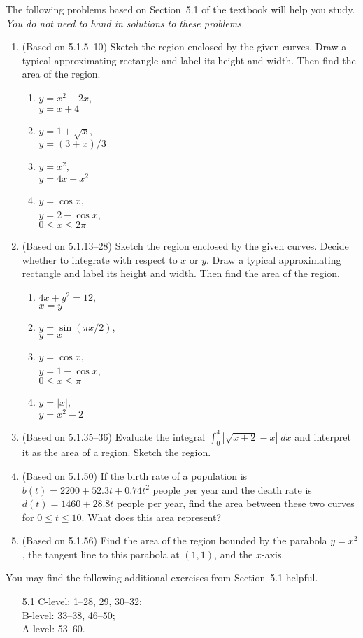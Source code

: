 \documentclass{article}
\title{\commonPSTitleZeroFiveOne}
\author{\commonAuthor}
\date{\commonDateZeroFiveOne}
\newcommand{\ds}{\displaystyle}
\begin{document}
\maketitle
\thispagestyle{empty}

\noindent
The following problems based on Section~5.1 of the textbook will help
you study.  \emph{You do not need to hand in solutions to these
  problems.}
\begin{enumerate}
\item (Based on 5.1.5--10) %
  Sketch the region enclosed by the given curves.  Draw a typical
  approximating rectangle and label its height and width.  Then find
  the area of the region.
  \begin{multicols}{4}
  \begin{enumerate}
  \item $y=x^2-2x$, \\ $y=x+4$
  \item $y=1+\sqrt{x}$, \\ $y=(3+x)/3$
  \item $y=x^2$, \\ $y=4x-x^2$
  \item $y=\cos x$, \\ $y=2-\cos x$, \\ $0\le x\le 2\pi$
  \end{enumerate}
  \end{multicols}
\item (Based on 5.1.13--28) %
  Sketch the region enclosed by the given curves.  Decide whether to
  integrate with respect to $x$ or $y$.  Draw a typical approximating
  rectangle and label its height and width.  Then find the area of the
  region.
  \begin{multicols}{4}
  \begin{enumerate}
  \item $4x+y^2=12$, \\ $x=y$
  \item $y=\sin(\pi x/2)$, \\ $y=x$
  \item $y=\cos x$, \\ $y=1-\cos x$, \\ $0\le x\le \pi$
  \item $y=|x|$, \\ $y=x^2-2$
  \end{enumerate}
  \end{multicols}
\item (Based on 5.1.35--36) %
  Evaluate the integral $\ds\int_0^4 \left| \sqrt{x+2}-x\right| \; dx$
  and interpret it as the area of a region.  Sketch the region.
\item (Based on 5.1.50) %
  If the birth rate of a population is $b(t)=2200 + 52.3t + 0.74t^2$
  people per year and the death rate is $d(t)=1460+28.8t$ people per
  year, find the area between these two curves for $0\le t\le 10$.
  What does this area represent?
\item (Based on 5.1.56) %
  Find the area of the region bounded by the parabola $y=x^2$, the
  tangent line to this parabola at $(1,1)$, and the $x$-axis.
\end{enumerate}

\noindent
You may find the following additional exercises from Section~5.1
helpful.
\begin{itemize}
\item[5.1]
  C-level: 1--28, 29, 30--32; \\
  B-level: 33--38, 46--50; \\
  A-level: 53--60.
\end{itemize}
\end{document}
